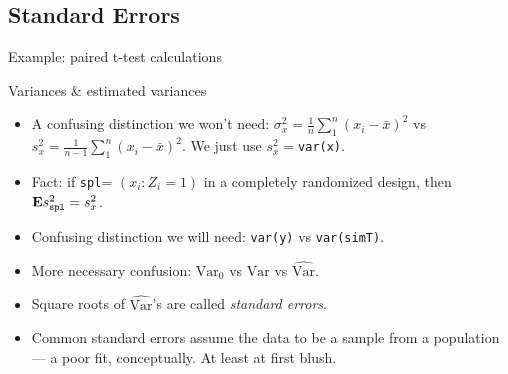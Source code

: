 \subsection{Standard Errors}

\begin{frame}[shrink]{Example: paired t-test calculations}
  
\end{frame}

\begin{frame}{Variances \& estimated variances  }

  \begin{itemize}
 \item A confusing distinction we won't need: $\sigma_{x}^{2} = \frac{1}{n} \sum_{1}^{n} (x_{i} - \bar
   x)^{2}$ vs  $s_{x}^{2} = \frac{1}{n-1} \sum_{1}^{n} (x_{i} - \bar
   x)^{2}$.  We just use $s_{x}^{2} =$\texttt{var(x)}.
 \item Fact: if \texttt{spl}= $(x_{i}: Z_{i}=1) $ in a completely
   randomized design, then $\mathbf{E} s_{\mathtt{spl}}^{2} = s_{x}^{2} $. 
  \item Confusing distinction we will need: \texttt{var(y)} vs \texttt{var(simT)}.
  \item More necessary confusion: $\mathrm{Var}_{0}$ vs $\mathrm{Var}$
    vs $\widehat{\mathrm{Var}}$.
  \item Square roots of $\widehat{\mathrm{Var}}$'s are called
    \textit{standard errors}.
  \item Common standard errors assume the data to be a sample from a
    population --- a poor fit, conceptually.  At least at first blush. 
  \end{itemize}

\end{frame}
